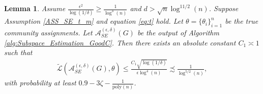 \documentclass{article}
\newtheorem{lemma}{Lemma}
\begin{document}
\begin{lemma}
\label{lemma:Pihat-Pi}
Assume $\frac{\epsilon^2}{\log(1/\delta)} \geq \frac{1}{\log^3(n)}$ and $d > \sqrt{n}\log^{11/2}(n)$. Suppose Assumption \ref{ASS_SE_t_m} and equation \eqref{eq:t} hold. Let $\theta = \{\theta_i\}_{i = 1}^n$ be the true community assignments. Let $\mathcal{A}_{SE}^{(\epsilon, \delta)}(G)$ be the output of Algorithm \ref{alg:Subspace_Estimation_GoodC}. Then there exists an absolute constant $C_1 \asymp 1$ such that
\begin{align*}
\widetilde{\mathcal{L}}\left(\mathcal{A}_{SE}^{(\epsilon, \delta)}(G), \theta\right) \leq \frac{C_1\sqrt{\log(1/\delta)}}{\epsilon\log^4(n)} \precsim \frac{1}{\log^{5/2}(n)},
\end{align*}
with probability at least $0.9 - 3\zeta - \frac{1}{\mathrm{poly}(n)}$.
\end{lemma}
\end{document}
